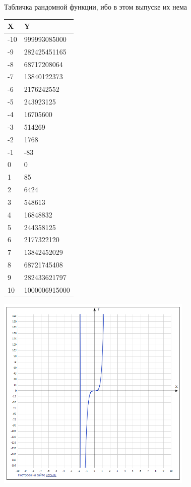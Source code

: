 \begin{multicols}{2}
\end{multicols}
\newpage
Табличка рандомной функции, ибо в этом выпуске их нема

\begin{tabular}{l|l}
    \hline
    X & Y\\
    \hline\hline
    -10	& 999993085000 \\
    -9	& 282425451165 \\
    -8	& 68717208064 \\
    -7	& 13840122373 \\
    -6	& 2176242552 \\
    -5	& 243923125 \\
    -4	& 16705600 \\
    -3	& 514269 \\
    -2	& 1768 \\
    -1	& -83 \\
    0	& 0 \\
    1	& 85 \\
    2	& 6424 \\
    3	& 548613 \\
    4	& 16848832 \\
    5	& 244358125 \\
    6	& 2177322120 \\
    7	& 13842452029 \\
    8	& 68721745408 \\
    9	& 282433621797 \\
    10	& 1000006915000
\end{tabular}

\includegraphics[width=0.7\textwidth]{func_img.png}


